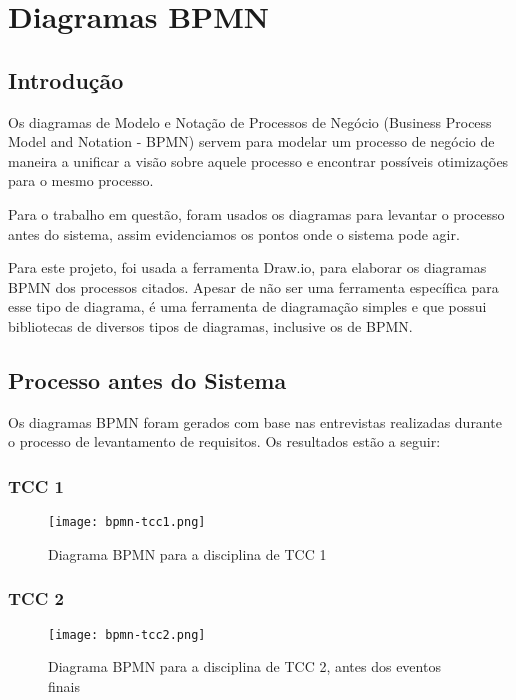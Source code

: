 \chapter{Diagramas BPMN}\label{chap:bpmn-appendix}

\section{Introdução}

Os diagramas de Modelo e Notação de Processos de Negócio (Business Process Model and Notation - BPMN) servem para modelar um processo de negócio de maneira a unificar a visão sobre aquele processo e encontrar possíveis otimizações para o mesmo processo.

Para o trabalho em questão, foram usados os diagramas para levantar o processo antes do sistema, assim evidenciamos os pontos onde o sistema pode agir.

Para este projeto, foi usada a ferramenta Draw.io\cite{drawio}, para elaborar os diagramas BPMN dos processos citados. Apesar de não ser uma ferramenta específica para esse tipo de diagrama, é uma ferramenta de diagramação simples e que possui bibliotecas de diversos tipos de diagramas, inclusive os de BPMN.

\section{Processo antes do Sistema}

Os diagramas BPMN foram gerados com base nas entrevistas realizadas durante o processo de levantamento de requisitos. Os resultados estão a seguir:

\subsection{TCC 1}
\begin{figure}[H]
    \centering
    \texttt{[image: bpmn-tcc1.png]}
    \caption{Diagrama BPMN para a disciplina de TCC 1}
    \label{fig:bpmn-tcc1}
\end{figure}

\subsection{TCC 2}
\begin{figure}[H]
    \centering
    \texttt{[image: bpmn-tcc2.png]}
    \caption{Diagrama BPMN para a disciplina de TCC 2, antes dos eventos finais}
    \label{fig:bpmn-tcc2}
\end{figure}

